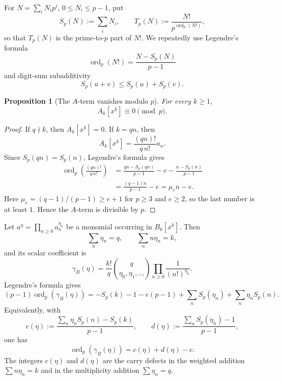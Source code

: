 \documentclass[11pt]{amsart}
\numberwithin{equation}{section}
\newtheorem{proposition}[proposition]{Proposition}
\DeclareMathOperator{\ordop}{ord}
\newcommand{\Sp}{S_p}
\newcommand{\Tp}{T_p}
\newcommand{\vp}{\ordop_p}
\begin{document}
For $N=\sum_iN_ip^i$, $0\le N_i\le p-1$, put
\[
        \Sp(N):=\sum_iN_i,
        \qquad
        \Tp(N):=\frac{N!}{p^{\vp(N!)}},
\]
so that $\Tp(N)$ is the prime-to-$p$ part of $N!$.  We repeatedly use Legendre's formula
\begin{equation}\label{eq:legendre}
        \vp(N!)=\frac{N-\Sp(N)}{p-1}
\end{equation}
and digit-sum subadditivity
\begin{equation}\label{eq:digit-subadditivity}
        \Sp(u+v)\le \Sp(u)+\Sp(v).
\end{equation}

\begin{proposition}[The $A$-term vanishes modulo $p$]\label{prop:A-zero}
For every $k\ge 1$,
\[
        A_k[x^k]\equiv 0\pmod p.
\]
\end{proposition}
\begin{proof}
If $q\nmid k$, then $A_k[x^k]=0$.  If $k=qn$, then
\[
        A_k[x^k]=\frac{(qn)!}{q\,n!}a_n.
\]
Since $\Sp(qn)=\Sp(n)$, Legendre's formula gives
\[
\begin{aligned}
\vp\left(\frac{(qn)!}{q\,n!}\right)
&=\frac{qn-\Sp(qn)}{p-1}-e-\frac{n-\Sp(n)}{p-1}  \\
&=\frac{(q-1)n}{p-1}-e
=\mu_en-e.
\end{aligned}
\]
Here $\mu_e=(q-1)/(p-1)\ge e+1$ for $p\ge3$ and $e\ge2$, so the last number is at least $1$.  Hence the $A$-term is divisible by $p$.
\end{proof}

Let $a^\eta=\prod_{n\ge0}a_n^{\eta_n}$ be a monomial occurring in $B_k[x^k]$.  Then
\[
        \sum_n\eta_n=q,
        \qquad
        \sum_n n\eta_n=k,
\]
and its scalar coefficient is
\[
        \gamma_B(\eta)=\frac{k!}{q}\binom{q}{\eta_0,\eta_1,\ldots}\prod_{n\ge0}\frac1{(n!)^{\eta_n}}.
\]
Legendre's formula gives
\begin{equation}\label{eq:B-valuation-general}
(p-1)\vp(\gamma_B(\eta))
=-\Sp(k)-1-e(p-1)+\sum_n\Sp(\eta_n)+\sum_n\eta_n\Sp(n).
\end{equation}
Equivalently, with
\[
        c(\eta):=\frac{\sum_n\eta_n\Sp(n)-\Sp(k)}{p-1},
        \qquad
        d(\eta):=\frac{\sum_n\Sp(\eta_n)-1}{p-1},
\]
one has
\begin{equation}\label{eq:B-cd}
        \vp(\gamma_B(\eta))=c(\eta)+d(\eta)-e.
\end{equation}
The integers $c(\eta)$ and $d(\eta)$ are the carry defects in the weighted addition $\sum n\eta_n=k$ and in the multiplicity addition $\sum\eta_n=q$.
\end{document}
